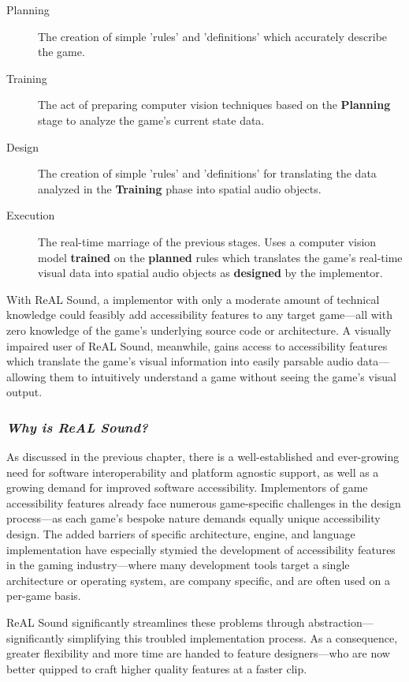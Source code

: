 \documentclass{report}
\newcommand{\rs}{ReAL Sound\xspace}
\begin{document}
\begin{description}
    \item [Planning] The creation of simple 'rules' and 'definitions' which accurately describe the game.
    \item [Training] The act of preparing computer vision techniques based on the \textbf{Planning} stage to analyze the game's current state data.
    \item [Design] The creation of simple 'rules' and 'definitions' for translating the data analyzed in the \textbf{Training} phase into spatial audio objects. 
    \item [Execution] The real-time marriage of the previous stages. Uses a computer vision model \textbf{trained} on the \textbf{planned} rules which translates the game's real-time visual data into spatial audio objects as \textbf{designed} by the implementor.    
\end{description}

With \rs, a implementor with only a moderate amount of technical knowledge  could feasibly add accessibility features to any target game---all with zero knowledge of the game's underlying source code or architecture. A visually impaired user of \rs, meanwhile, gains access to accessibility features which translate the game's visual information into easily parsable audio data---allowing them to intuitively understand a game without seeing the game's visual output. 


\subsubsection{\emph{Why is \rs?}}
As discussed in the previous chapter, there is a well-established and ever-growing need for software interoperability and platform agnostic support, as well as a growing demand for improved software accessibility. Implementors of game accessibility features already face numerous game-specific challenges in the design process---as each game's bespoke nature demands equally unique accessibility design. The added barriers of specific architecture, engine, and language implementation have especially stymied the development of accessibility features in the gaming industry---where many development tools target a single architecture or operating system, are company specific, and are often used on a per-game basis. 

\rs significantly streamlines these problems through abstraction---significantly simplifying this troubled implementation process. As a consequence, greater flexibility and more time are handed to feature designers---who are now better quipped to craft higher quality features at a faster clip.
\end{document}
